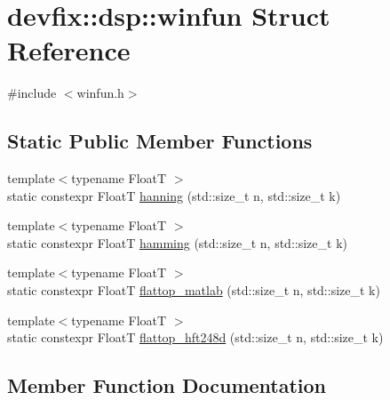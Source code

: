 \hypertarget{structdevfix_1_1dsp_1_1winfun}{}\section{devfix\+:\+:dsp\+:\+:winfun Struct Reference}
\label{structdevfix_1_1dsp_1_1winfun}


{\ttfamily \#include $<$winfun.\+h$>$}

\subsection*{Static Public Member Functions}
\begin{DoxyCompactItemize}
\item 
{\footnotesize template$<$typename FloatT $>$ }\\static constexpr FloatT \hyperlink{structdevfix_1_1dsp_1_1winfun_a96c4fbf23b5738423ed34497cd498bd2}{hanning} (std\+::size\+\_\+t n, std\+::size\+\_\+t k)
\item 
{\footnotesize template$<$typename FloatT $>$ }\\static constexpr FloatT \hyperlink{structdevfix_1_1dsp_1_1winfun_a9ae2b4ce20ad3750feebdf33ffbbdcba}{hamming} (std\+::size\+\_\+t n, std\+::size\+\_\+t k)
\item 
{\footnotesize template$<$typename FloatT $>$ }\\static constexpr FloatT \hyperlink{structdevfix_1_1dsp_1_1winfun_ade67435e6edbb6f742ba734069d21b77}{flattop\+\_\+matlab} (std\+::size\+\_\+t n, std\+::size\+\_\+t k)
\item 
{\footnotesize template$<$typename FloatT $>$ }\\static constexpr FloatT \hyperlink{structdevfix_1_1dsp_1_1winfun_a4acdcd971ecc33bc7500197e9609ff76}{flattop\+\_\+hft248d} (std\+::size\+\_\+t n, std\+::size\+\_\+t k)
\end{DoxyCompactItemize}


\subsection{Member Function Documentation}
\mbox{\label{structdevfix_1_1dsp_1_1winfun_a4acdcd971ecc33bc7500197e9609ff76}} 
